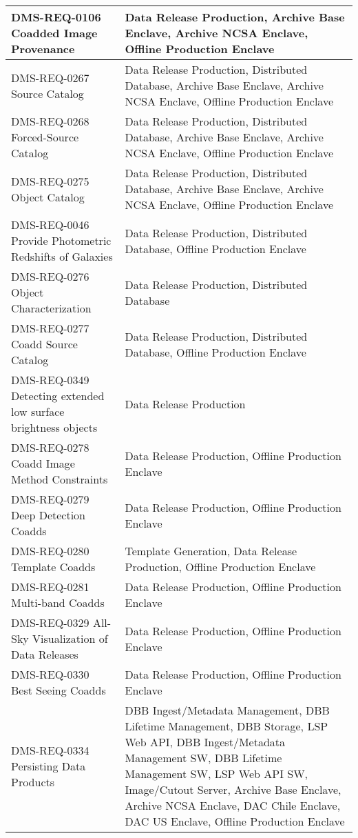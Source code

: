 \begin{longtable}{p{}p{}}
DMS-REQ-0106 Coadded Image Provenance & Data Release Production, Archive Base Enclave, Archive NCSA Enclave, Offline Production Enclave \\ \hline
DMS-REQ-0267 Source Catalog & Data Release Production, Distributed Database, Archive Base Enclave, Archive NCSA Enclave, Offline Production Enclave \\ \hline
DMS-REQ-0268 Forced-Source Catalog & Data Release Production, Distributed Database, Archive Base Enclave, Archive NCSA Enclave, Offline Production Enclave \\ \hline
DMS-REQ-0275 Object Catalog & Data Release Production, Distributed Database, Archive Base Enclave, Archive NCSA Enclave, Offline Production Enclave \\ \hline
DMS-REQ-0046 Provide Photometric Redshifts of Galaxies & Data Release Production, Distributed Database, Offline Production Enclave \\ \hline
DMS-REQ-0276 Object Characterization & Data Release Production, Distributed Database \\ \hline
DMS-REQ-0277 Coadd Source Catalog & Data Release Production, Distributed Database, Offline Production Enclave \\ \hline
DMS-REQ-0349 Detecting extended  low surface brightness objects & Data Release Production \\ \hline
DMS-REQ-0278 Coadd Image Method Constraints & Data Release Production, Offline Production Enclave \\ \hline
DMS-REQ-0279 Deep Detection Coadds & Data Release Production, Offline Production Enclave \\ \hline
DMS-REQ-0280 Template Coadds & Template Generation, Data Release Production, Offline Production Enclave \\ \hline
DMS-REQ-0281 Multi-band Coadds & Data Release Production, Offline Production Enclave \\ \hline
DMS-REQ-0329 All-Sky Visualization of Data Releases & Data Release Production, Offline Production Enclave \\ \hline
DMS-REQ-0330 Best Seeing Coadds & Data Release Production, Offline Production Enclave \\ \hline
DMS-REQ-0334 Persisting Data Products & DBB Ingest/Metadata Management, DBB Lifetime Management, DBB Storage, LSP Web API, DBB Ingest/Metadata Management SW, DBB Lifetime Management SW, LSP Web API SW, Image/Cutout Server, Archive Base Enclave, Archive NCSA Enclave, DAC Chile Enclave, DAC US Enclave, Offline Production Enclave \\ \hline

\end{longtable}
